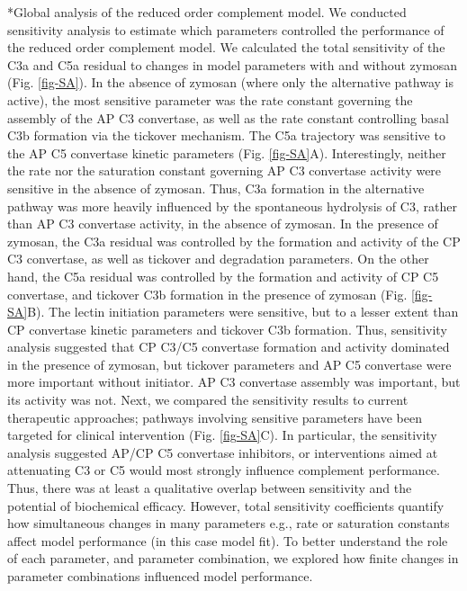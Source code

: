 \documentclass[12pt]{article}
\makeatletter
\renewcommand\subsection{\@startsection
	{subsection}{2}{0mm}
	{-0.05in}
	{-0.5\baselineskip}
	{\normalfont\normalsize\bfseries}}
\makeatother
\begin{document}
\subsection*{Global analysis of the reduced order complement model.}
We conducted sensitivity analysis to estimate which parameters controlled the performance of the reduced order complement model.
We calculated the total sensitivity of the C3a and C5a residual to changes in model parameters with and without zymosan (Fig. \ref{fig-SA}).
In the absence of zymosan (where only the alternative pathway is active), the most sensitive parameter was the rate constant governing the assembly of the AP C3 convertase, as
well as the rate constant controlling basal C3b formation via the tickover mechanism. The C5a trajectory was sensitive to the AP C5 convertase kinetic parameters (Fig. \ref{fig-SA}A).
Interestingly, neither the rate nor the saturation constant governing AP C3 convertase activity were sensitive in the absence of zymosan.
Thus, C3a formation in the alternative pathway was more heavily influenced by the spontaneous hydrolysis of C3, rather than AP C3 convertase activity, in the absence of zymosan.
In the presence of zymosan, the C3a residual was controlled by the formation and activity of the CP C3 convertase, as well as tickover and degradation parameters.
On the other hand, the C5a residual was controlled by the formation and activity of CP C5 convertase, and tickover C3b formation in the presence of zymosan (Fig. \ref{fig-SA}B).
The lectin initiation parameters were sensitive, but to a lesser extent than CP convertase kinetic parameters and tickover C3b formation.
Thus, sensitivity analysis suggested that CP C3/C5 convertase formation and activity dominated in the presence of zymosan, but tickover parameters and AP C5 convertase were more important
without initiator. AP C3 convertase assembly was important, but its activity was not.
Next, we compared the sensitivity results to current therapeutic approaches;
pathways involving sensitive parameters have been targeted for clinical intervention (Fig. \ref{fig-SA}C).
In particular, the sensitivity analysis suggested AP/CP C5 convertase inhibitors, or interventions aimed at attenuating C3 or C5 would most strongly influence complement performance.
Thus, there was at least a qualitative overlap between sensitivity and the potential of biochemical efficacy.
However, total sensitivity coefficients quantify how simultaneous changes in many parameters e.g., rate or saturation constants affect model performance (in this case model fit).
To better understand the role of each parameter, and parameter combination, we explored how finite changes in parameter combinations influenced model performance.
\end{document}
